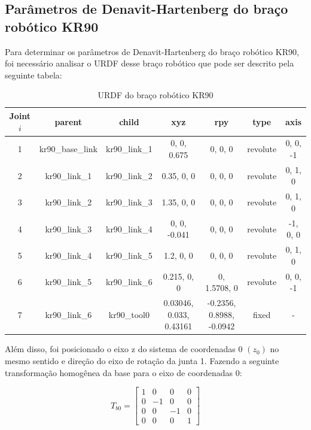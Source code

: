 \documentclass[10pt]{article}
\begin{document}
\subsection{Parâmetros de Denavit-Hartenberg do braço robótico KR90}

\quad Para determinar os parâmetros de Denavit-Hartenberg do braço robótico KR90, foi necessário analisar o URDF desse braço robótico que pode ser descrito pela seguinte tabela:

\begin{table}[h!]
    \centering
    \begin{tabular}{|c|c|c|c|c|c|c|}
    \hline
    \textbf{Joint $i$} & \textbf{parent} & \textbf{child} & \textbf{xyz} & \textbf{rpy} & \textbf{type} & \textbf{axis} \\ \hline
    1 & kr90\_base\_link & kr90\_link\_1 & 0, 0, 0.675 & 0, 0, 0 & revolute & 0, 0, -1 \\ \hline
    2 & kr90\_link\_1 & kr90\_link\_2 & 0.35, 0, 0 & 0, 0, 0 & revolute & 0, 1, 0 \\ \hline
    3 & kr90\_link\_2 & kr90\_link\_3 & 1.35, 0, 0 & 0, 0, 0 & revolute & 0, 1, 0 \\ \hline
    4 & kr90\_link\_3 & kr90\_link\_4 & 0, 0, -0.041 & 0, 0, 0 & revolute & -1, 0, 0 \\ \hline
    5 & kr90\_link\_4 & kr90\_link\_5 & 1.2, 0, 0 & 0, 0, 0 & revolute & 0, 1, 0 \\ \hline
    6 & kr90\_link\_5 & kr90\_link\_6 & 0.215, 0, 0 & 0, 1.5708, 0 & revolute & 0, 0, -1 \\ \hline
    7 & kr90\_link\_6 & kr90\_tool0 & 0.03046, 0.033, 0.43161 & -0.2356, 0.8988, -0.0942 & fixed & - \\ \hline
    \end{tabular}
    \caption{URDF do braço robótico KR90}
\end{table}

\quad Além disso, foi posicionado o eixo z do sistema de coordenadas 0 \((z_0)\) no mesmo sentido e direção do eixo de rotação da junta 1.
Fazendo a seguinte transformação homogênea da base para o eixo de coordenadas 0:

\begin{equation}
    T_{b0} = \begin{bmatrix}
        1 & 0 & 0 & 0 \\
        0 & -1 & 0 & 0 \\
        0 & 0 & -1 & 0 \\
        0 & 0 & 0 & 1 
        \end{bmatrix}
\end{equation}
\end{document}
